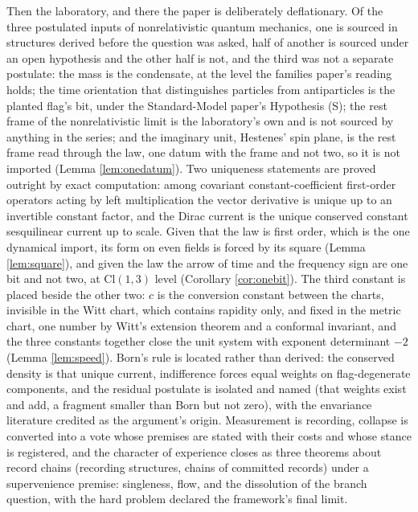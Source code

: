 \documentclass[11pt]{article}
\theoremstyle{definition}
\newcommand{\Cl}{\mathrm{Cl}}
\begin{document}
Then the laboratory, and there the paper is deliberately deflationary. Of the three postulated inputs of nonrelativistic quantum mechanics, one is sourced in structures derived before the question was asked, half of another is sourced under an open hypothesis and the other half is not, and the third was not a separate postulate: the mass is the condensate, at the level the families paper's reading holds; the time orientation that distinguishes particles from antiparticles is the planted flag's bit, under the Standard-Model paper's Hypothesis (S); the rest frame of the nonrelativistic limit is the laboratory's own and is not sourced by anything in the series; and the imaginary unit, Hestenes' spin plane, is the rest frame read through the law, one datum with the frame and not two, so it is not imported (Lemma \ref{lem:onedatum}). Two uniqueness statements are proved outright by exact computation: among covariant constant-coefficient first-order operators acting by left multiplication the vector derivative is unique up to an invertible constant factor, and the Dirac current is the unique conserved constant sesquilinear current up to scale. Given that the law is first order, which is the one dynamical import, its form on even fields is forced by its square (Lemma \ref{lem:square}), and given the law the arrow of time and the frequency sign are one bit and not two, at $\Cl(1,3)$ level (Corollary \ref{cor:onebit}). The third constant is placed beside the other two: $c$ is the conversion constant between the charts, invisible in the Witt chart, which contains rapidity only, and fixed in the metric chart, one number by Witt's extension theorem and a conformal invariant, and the three constants together close the unit system with exponent determinant $-2$ (Lemma \ref{lem:speed}). Born's rule is located rather than derived: the conserved density is that unique current, indifference forces equal weights on flag-degenerate components, and the residual postulate is isolated and named (that weights exist and add, a fragment smaller than Born but not zero), with the envariance literature credited as the argument's origin. Measurement is recording, collapse is converted into a vote whose premises are stated with their costs and whose stance is registered, and the character of experience closes as three theorems about record chains (recording structures, chains of committed records) under a supervenience premise: singleness, flow, and the dissolution of the branch question, with the hard problem declared the framework's final limit.
\end{document}
